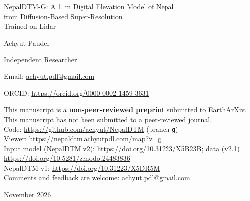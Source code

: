 \documentclass[11pt]{article}
\title{\gtitle}
\author{Achyut Paudel\\
\small \affil\\
\small \email\quad ORCID: \url{https://orcid.org/\orcidid}}
\date{November 2026}
\makeatletter
\newcommand{\gtitle}{NepalDTM-G: A 1~m Digital Elevation Model of Nepal\\[2pt] from Diffusion-Based Super-Resolution\\[2pt] Trained on Lidar}
\newcommand{\orcidid}{0000-0002-1459-3631}
\newcommand{\affil}{Independent Researcher}
\newcommand{\email}{\href{mailto:achyut.pdl@gmail.com}{achyut.pdl@gmail.com}}
\newcommand{\journalnote}{This manuscript has not been submitted to a peer-reviewed journal.}
\makeatother
\begin{document}
\begin{titlepage}
\centering
\vspace*{2cm}
{\LARGE \gtitle\par}
\vspace{1.5cm}
{\large Achyut Paudel\par}
\vspace{4pt}
\affil\par
Email: \email\par
ORCID: \url{https://orcid.org/\orcidid}\par
\vspace{1.5cm}
\begin{minipage}{0.82\textwidth}
\centering
This manuscript is a \textbf{non-peer-reviewed preprint} submitted to EarthArXiv.\\[4pt]
\journalnote\\[12pt]
Code: \url{https://github.com/achyut/NepalDTM} (branch \texttt{g})\\
Viewer: \url{https://nepaldtm.achyutpdl.com/map?v=g}\\
Input model (NepalDTM v2): \url{https://doi.org/10.31223/X5B23B}; data (v2.1) \url{https://doi.org/10.5281/zenodo.24483836}\\
NepalDTM v1: \url{https://doi.org/10.31223/X5DR5M}\\[12pt]
Comments and feedback are welcome: \email
\end{minipage}
\vfill
{\small November 2026\par}
\end{titlepage}
\setcounter{page}{1}
\maketitle

\begin{abstract}
No open digital elevation model (DEM) of Nepal exists at 1~m. The finest national measured model is NepalDTM v2 (M), a bare-earth
model on an 8~m grid. NepalDTM-G (G) adds 1~m detail to M without changing it at 8~m. G is a deep-learning super-resolution model, a conditional denoising
diffusion model trained on 75{,}521 lidar patches from the Swiss Alps and three United States mountain ranges, each
degraded with an error model fitted to M, so that training inputs look like the real product rather than clean block
averages. A smooth mass-preserving projection, applied after the samples are combined and the windows blended, makes
every $8\times8$~m block of G average to its M cell within 2~mm. On held-out lidar patches the final model is 3.3\% more
accurate than bicubic interpolation and matches the true slope field better (correlation 0.70 against 0.63); ten
sampling steps with two samples give the same result at a tenth of the cost. Against held-out ICESat-2 photons in two
test areas of Chitwan, G is 1--2\% worse than M. We show that this is a limit of the test, not of G: with the few metres
of horizontal error of the photons, even the true 1~m surface scores worse than bicubic, so point photons can check G's
8~m content, which equals M, but not its detail. G's detail is generated, not measured, and it is published as a
product separate from M.
\end{abstract}
\end{document}
